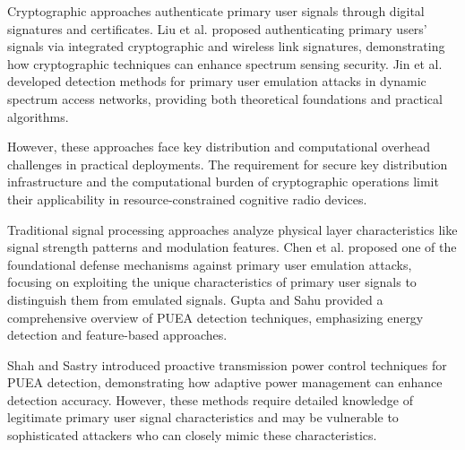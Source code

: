 \documentclass[pdflatex,sn-mathphys-num]{sn-jnl}%
\theoremstyle{thmstyleone}
\theoremstyle{thmstyletwo}
\theoremstyle{thmstylethree}
\begin{document}

Cryptographic approaches authenticate primary user signals through digital signatures and certificates. Liu et al. \cite{ref5} proposed authenticating primary users' signals via integrated cryptographic and wireless link signatures, demonstrating how cryptographic techniques can enhance spectrum sensing security. Jin et al. \cite{ref6,ref15} developed detection methods for primary user emulation attacks in dynamic spectrum access networks, providing both theoretical foundations and practical algorithms.

However, these approaches face key distribution and computational overhead challenges in practical deployments. The requirement for secure key distribution infrastructure and the computational burden of cryptographic operations limit their applicability in resource-constrained cognitive radio devices.


Traditional signal processing approaches analyze physical layer characteristics like signal strength patterns and modulation features. Chen et al. \cite{ref4} proposed one of the foundational defense mechanisms against primary user emulation attacks, focusing on exploiting the unique characteristics of primary user signals to distinguish them from emulated signals. Gupta and Sahu \cite{ref1} provided a comprehensive overview of PUEA detection techniques, emphasizing energy detection and feature-based approaches.

Shah and Sastry \cite{ref11} introduced proactive transmission power control techniques for PUEA detection, demonstrating how adaptive power management can enhance detection accuracy. However, these methods require detailed knowledge of legitimate primary user signal characteristics and may be vulnerable to sophisticated attackers who can closely mimic these characteristics.

\end{document}
